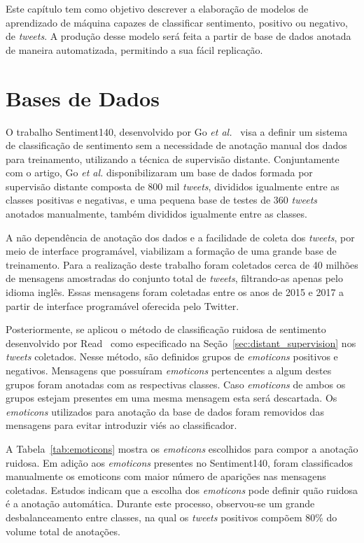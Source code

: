 Este capítulo tem como objetivo descrever a elaboração de modelos de aprendizado de máquina capazes de classificar
sentimento, positivo ou negativo, de \textit{tweets}.
A produção desse modelo será feita a partir de base de dados anotada de maneira automatizada, permitindo a sua
fácil replicação.

\section{Bases de Dados} \label{sec:data}

O trabalho Sentiment140, desenvolvido por Go \textit{et al.}~\cite{go09} visa a definir um sistema de classificação de
sentimento sem a necessidade de anotação manual dos dados para treinamento, utilizando a técnica de supervisão distante.
Conjuntamente com o artigo, Go \textit{et al.} disponibilizaram um base de dados formada por supervisão distante composta
de 800 mil \textit{tweets}, divididos igualmente entre as classes positivas e negativas, e uma pequena base de testes de
360 \textit{tweets} anotados manualmente, também divididos igualmente entre as classes.

A não dependência de anotação dos dados e a facilidade de coleta dos \textit{tweets}, por meio de interface programável,
viabilizam a formação de uma grande base de treinamento.
Para a realização deste trabalho foram coletados cerca de 40 milhões de mensagens amostradas do conjunto total de
\textit{tweets}, filtrando-as apenas pelo idioma inglês.
Essas mensagens foram coletadas entre os anos de 2015 e 2017 a partir de interface programável oferecida pelo Twitter.

Posteriormente, se aplicou o método de classificação ruidosa de sentimento desenvolvido por Read~\cite{read05} como
especificado na Seção~\ref{sec:distant_supervision} nos \textit{tweets} coletados.
Nesse método, são definidos grupos de \textit{emoticons} positivos e negativos.
Mensagens que possuíram \textit{emoticons} pertencentes a algum destes grupos foram anotadas com as respectivas classes.
Caso \textit{emoticons} de ambos os grupos estejam presentes em uma mesma mensagem esta será descartada.
Os \textit{emoticons} utilizados para anotação da base de dados foram removidos das mensagens para evitar introduzir
viés ao classificador.

A Tabela~\ref{tab:emoticons} mostra os \textit{emoticons} escolhidos para compor a anotação ruidosa.
Em adição aos \textit{emoticons} presentes no Sentiment140, foram classificados manualmente os emoticons com maior
número de aparições nas mensagens coletadas.
Estudos indicam que a escolha dos \textit{emoticons} pode definir quão ruidosa é a anotação automática.
Durante este processo, observou-se um grande desbalanceamento entre classes, na qual os \textit{tweets} positivos
compõem 80\% do volume total de anotações.

